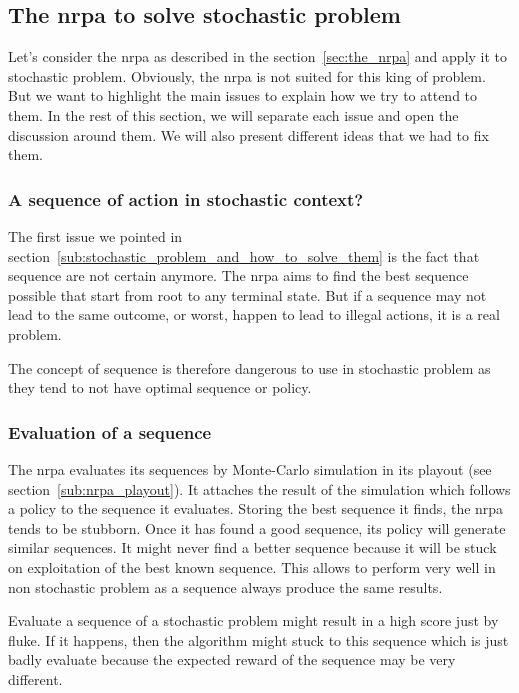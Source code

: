 \subsection{The \acrshort{nrpa} to solve stochastic problem}%
\label{sub:the_nrpa_to_solve_stochastic_problem}

Let's consider the \gls{nrpa} as described in the section~\ref{sec:the_nrpa} and apply it to stochastic problem.
Obviously, the \gls{nrpa} is not suited for this king of problem.
But we want to highlight the main issues to explain how we try to attend to them.
In the rest of this section, we will separate each issue and open the discussion around them.
We will also present different ideas that we had to fix them.

\subsubsection{A sequence of action in stochastic context?}%
\label{ssub:a_sequence_of_action_in_stochastic_context}

The first issue we pointed in section~\ref{sub:stochastic_problem_and_how_to_solve_them} is the fact that sequence are not certain anymore.
The \gls{nrpa} aims to find the best sequence possible that start from root to any terminal state.
But if a sequence may not lead to the same outcome, or worst, happen to lead to illegal actions, it is a real problem.

The concept of sequence is therefore dangerous to use in stochastic problem as they tend to not have optimal sequence or policy.

\subsubsection{Evaluation of a sequence}%
\label{ssub:evaluation_of_a_sequence}

The \gls{nrpa} evaluates its sequences by Monte-Carlo simulation in its playout (see section~\ref{sub:nrpa_playout}).
It attaches the result of the simulation which follows a policy to the sequence it evaluates.
Storing the best sequence it finds, the \gls{nrpa} tends to be stubborn.
Once it has found a good sequence, its policy will generate similar sequences.
It might never find a better sequence because it will be stuck on exploitation of the best known sequence.
This allows to perform very well in non stochastic problem as a sequence always produce the same results.

Evaluate a sequence of a stochastic problem might result in a high score just by fluke.
If it happens, then the algorithm might stuck to this sequence which is just badly evaluate because the expected reward of the sequence may be very different.

